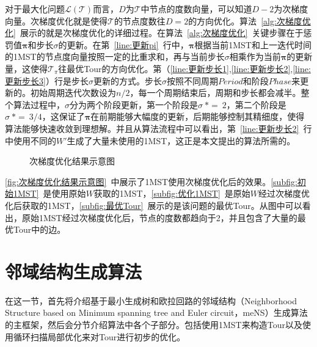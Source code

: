 对于最大化问题$\mathcal{L}(\mathcal{T})$而言，$D$为$\mathcal{T}$中节点的度数向量，可以知道$D-2$为次梯度向量。次梯度优化就是使得$\mathcal{T}$的节点度数往$D=2$的方向优化。算法~\ref{alg:次梯度优化}~展示的就是次梯度优化的详细过程。在算法~\ref{alg:次梯度优化}~关键步骤在于惩罚值$\mathbf{\pi}$和步长$\sigma$的更新。在第~\ref{line:更新pi}~行中，$\mathbf{\pi}$根据当前1MST和上一迭代时间的1MST的节点度向量按照一定的比重求和，再与当前步长$\sigma$相乘作为当前$\mathbf{\pi}$的更新量，这使得$\mathcal{T_{\pi}}$往最优Tour的方向优化。第（\ref{line:更新步长1},\ref{line:更新步长2},\ref{line:更新步长3}）行是步长$\sigma$更新的方式。步长$\sigma$按照不同周期$Period$和阶段$Phase$来更新的。初始周期迭代次数设为$n/2$，每一个周期结束后，周期和步长都会减半。整个算法过程中，$\sigma$分为两个阶段更新，第一个阶段是$\sigma \ *= \ 2$，第二个阶段是$\sigma \ *= \ 3/4$，这保证了$\mathbf{\pi}$在前期能够大幅度的更新，后期能够控制其精细度，使得算法能够快速收敛到理想解\cite{crowder1974computational,hansen1974improvements}。并且从算法流程中可以看出，第~\ref{line:更新步长2}~行中使用不同的$W'$生成了大量未使用的1MST，这正是本文提出的算法所需的。
\par
\begin{figure}[htb]
    \caption[次梯度优化结果示意图]{次梯度优化结果示意图}
    \label{fig:次梯度优化结果示意图}
\end{figure}
\par
\autoref{fig:次梯度优化结果示意图}~中展示了1MST使用次梯度优化后的效果。\autoref{subfig:初始1MST}~是使用原始$W$获取的1MST，\autoref{subfig:优化1MST}~是原始$W$经过次梯度优化后获取的1MST，\autoref{subfig:最优Tour}~展示的是该问题的最优Tour。从图中可以看出，原始1MST经过次梯度优化后，节点的度数都趋向于2，并且包含了大量的最优Tour中的边。

\section{邻域结构生成算法}
\label{sec:NS_Method:邻域结构生成算法}
在这一节，首先将介绍基于最小生成树和欧拉回路的邻域结构（Neighborhood Structure based on Minimum spanning tree and Euler circuit，meNS）生成算法的主框架，然后会分节介绍算法中各个子部分。包括使用1MST来构造Tour以及使用循环扫描局部优化来对Tour进行初步的优化。

